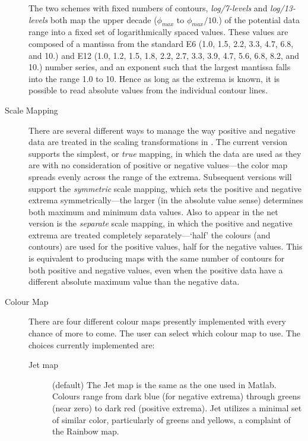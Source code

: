 \begin{description}
    The two schemes with fixed numbers of contours, {\em log/7-levels\/}
    and {\em log/13-levels\/} both map the upper decade ($\phi_{max}$ to
    $\phi_{max}/10.$) of the potential data range into a fixed set of
    logarithmically spaced values.  These values are composed of a mantissa
    from the standard E6 (1.0, 1.5, 2.2, 3.3, 4.7, 6.8, and 10.) and E12
    (1.0, 1.2, 1.5, 1.8, 2.2, 2.7, 3.3, 3.9, 4.7, 5.6, 6.8, 8.2, and 10.)
    number series, and an exponent such that the largest mantissa falls
    into the range 1.0 to 10. Hence as long as the extrema is known, it is
    possible to read absolute values from the individual contour lines.
    
  \item[Scale Mapping] There are several different ways to manage the way
    positive and negative data are treated in the scaling transformations
    in \map{}.  The current version supports the simplest, or {\em true\/}
    mapping, in which the data are used as they are with no consideration
    of positive or negative values---the color map spreads evenly across
    the range of the extrema.  Subsequent versions will support the {\em
      symmetric\/} scale mapping, which sets the positive and negative
    extrema symmetrically---the larger (in the absolute value sense)
    determines both maximum and minimum data values.  Also to appear in the
    net version is the {\em separate\/} scale mapping, in which the
    positive and negative extrema are treated completely
    separately---`half' the colours (and contours) are used for the
    positive values, half for the negative values.  This is equivalent to
    producing maps with the same number of contours for both positive and
    negative values, even when the positive data have a different absolute
    maximum value than the negative data.
    
  \item[Colour Map] There are four different colour maps presently
    implemented with every chance of more to come. The user can select
    which colour map to use. The choices currently implemented are:
    \begin{description}
        
      \item [Jet map] (default) The Jet map is the same as the one 
        used in Matlab. Colours range from dark
        blue (for negative extrema) through greens (near zero)
        to dark red (positive extrema).  Jet utilizes a minimal set of similar
        color, particularly of greens and yellows, a complaint of the 
        Rainbow map.


\end{description}
\end{description}
